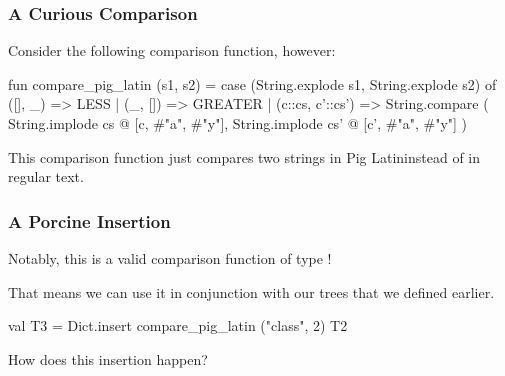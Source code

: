 \documentclass[aspectratio=169]{beamer}
\begin{document}
\begin{frame}[fragile]
  \frametitle{A Curious Comparison}

  Consider the following comparison function, however:

  \begin{codeblock}
    fun compare_pig_latin (s1, s2) = 
      case (String.explode s1, String.explode s2) of
        ([], _) => LESS
      | (_, []) => GREATER
      | (c::cs, c'::cs') => 
          String.compare (
            String.implode cs  @ [c, #"a", #"y"],
            String.implode cs' @ [c', #"a", #"y"]
          )
  \end{codeblock}

  This comparison function just compares two strings in Pig Latin\footnotemark instead of
  in regular text.

\end{frame}

\begin{frame}[fragile]
  \frametitle{A Porcine Insertion}

  Notably, this is a valid comparison function of type ! 

  That means we can use it in conjunction with our  trees
  that we defined earlier.

  \begin{codeblock}
    val T3 = Dict.insert compare_pig_latin ("class", 2) T2 
  \end{codeblock}

  How does this insertion happen?
\end{frame}
\end{document}
